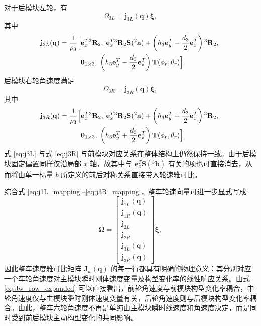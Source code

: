 对于后模块左轮，有
\begin{equation}
\Omega_{3L}
=
\mathbf j_{3L}(\mathbf q)\boldsymbol\xi,
\label{eq:j3L_mapping}
\end{equation}
其中
\begin{equation}
\mathbf j_{3L}(\mathbf q)
=
\frac{1}{\rho_3}
\begin{aligned}[t]
\Bigl[
&\mathbf e_x^T{}^{3}\mathbf R_2,\;
\mathbf e_x^T{}^{3}\mathbf R_2\mathbf S({}^{2}\mathbf a)
+\left(h_3\mathbf e_y^T-\frac{d_3}{2}\mathbf e_z^T\right){}^{3}\mathbf R_2,\;\\
&\mathbf 0_{1\times 3},\;
\left(h_3\mathbf e_y^T-\frac{d_3}{2}\mathbf e_z^T\right)\mathbf T(\phi_r,\theta_r)
\Bigr].
\end{aligned}
\label{eq:j3L}
\end{equation}
后模块右轮角速度满足
\begin{equation}
\Omega_{3R}
=
\mathbf j_{3R}(\mathbf q)\boldsymbol\xi,
\label{eq:j3R_mapping}
\end{equation}
其中
\begin{equation}
\mathbf j_{3R}(\mathbf q)
=
\frac{1}{\rho_3}
\begin{aligned}[t]
\Bigl[
&\mathbf e_x^T{}^{3}\mathbf R_2,\;
\mathbf e_x^T{}^{3}\mathbf R_2\mathbf S({}^{2}\mathbf a)
+\left(h_3\mathbf e_y^T+\frac{d_3}{2}\mathbf e_z^T\right){}^{3}\mathbf R_2,\;\\
&\mathbf 0_{1\times 3},\;
\left(h_3\mathbf e_y^T+\frac{d_3}{2}\mathbf e_z^T\right)\mathbf T(\phi_r,\theta_r)
\Bigr].
\end{aligned}
\label{eq:j3R}
\end{equation}
式 \eqref{eq:j3L} 与式 \eqref{eq:j3R} 与前模块对应关系在整体结构上仍然保持一致。由于后模块固定偏置同样仅沿局部 $x$ 轴，故其中与 $\mathbf e_x^T\mathbf S({}^{3}\mathbf b)$ 有关的项也可直接消去，从而将由单一标量 $b$ 所定义的前后对称关系直接带入轮速雅可比。

综合式 \eqref{eq:j1L_mapping}--\eqref{eq:j3R_mapping}，整车轮速向量可进一步显式写成
\begin{equation}
\boldsymbol\Omega
=
\begin{bmatrix}
\mathbf j_{1L}(\mathbf q)\\
\mathbf j_{1R}(\mathbf q)\\
\mathbf j_{2L}\\
\mathbf j_{2R}\\
\mathbf j_{3L}(\mathbf q)\\
\mathbf j_{3R}(\mathbf q)
\end{bmatrix}
\boldsymbol\xi,
\label{eq:Jw_row_expanded}
\end{equation}
因此整车速度雅可比矩阵 $\mathbf J_w(\mathbf q)$ 的每一行都具有明确的物理意义：其分别对应一个车轮角速度对主模块瞬时刚体速度变量及构型变化率的线性响应关系。由式 \eqref{eq:Jw_row_expanded} 可以直接看出，前轮角速度与前模块构型变化率耦合，中轮角速度仅与主模块瞬时刚体速度变量有关，后轮角速度则与后模块构型变化率耦合。由此，整车六轮角速度不再是单纯由主模块瞬时线速度和角速度决定，而是同时受到前后模块主动构型变化的共同影响。

